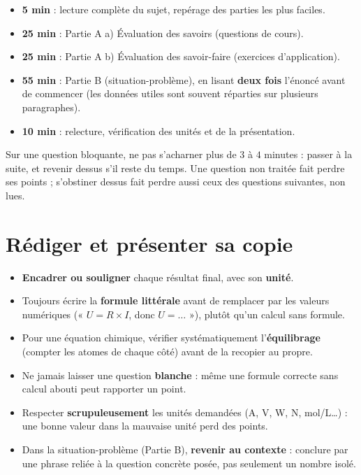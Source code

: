 \begin{propriete}
\begin{itemize}
\item \textbf{5 min} : lecture complète du sujet, repérage des parties les plus faciles.
\item \textbf{25 min} : Partie A a) Évaluation des savoirs (questions de cours).
\item \textbf{25 min} : Partie A b) Évaluation des savoir-faire (exercices d'application).
\item \textbf{55 min} : Partie B (situation-problème), en lisant \textbf{deux fois}
l'énoncé avant de commencer (les données utiles sont souvent réparties sur plusieurs
paragraphes).
\item \textbf{10 min} : relecture, vérification des unités et de la présentation.
\end{itemize}
\end{propriete}

\begin{remarque}
Sur une question bloquante, ne pas s'acharner plus de $3$ à $4$ minutes : passer à la
suite, et revenir dessus s'il reste du temps. Une question non traitée fait perdre ses
points ; s'obstiner dessus fait perdre aussi ceux des questions suivantes, non lues.
\end{remarque}

\section{Rédiger et présenter sa copie}

\begin{propriete}
\begin{itemize}
\item \textbf{Encadrer ou souligner} chaque résultat final, avec son \textbf{unité}.
\item Toujours écrire la \textbf{formule littérale} avant de remplacer par les valeurs
numériques (« $U=R\times I$, donc $U=\dots$ »), plutôt qu'un calcul sans formule.
\item Pour une équation chimique, vérifier systématiquement l'\textbf{équilibrage}
(compter les atomes de chaque côté) avant de la recopier au propre.
\item Ne jamais laisser une question \textbf{blanche} : même une formule correcte sans
calcul abouti peut rapporter un point.
\item Respecter \textbf{scrupuleusement} les unités demandées (A, V, W, N, mol/L\dots) :
une bonne valeur dans la mauvaise unité perd des points.
\item Dans la situation-problème (Partie B), \textbf{revenir au contexte} : conclure par
une phrase reliée à la question concrète posée, pas seulement un nombre isolé.
\end{itemize}
\end{propriete}

